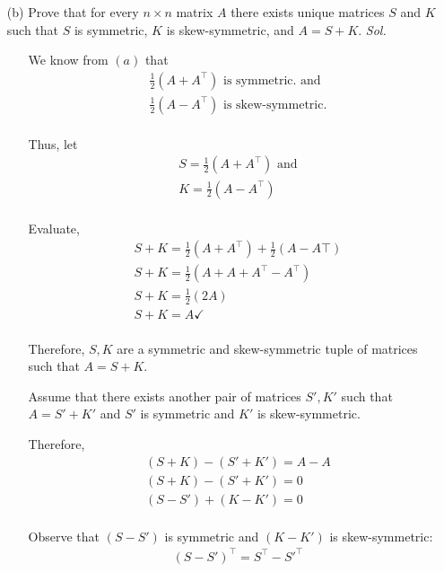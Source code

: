 \documentclass[11pt]{article}
\begin{document}
\begin{itemize}
  \item[(b)] Prove that for every $n \times n$ matrix $A$ there exists unique 
    matrices $S$ and $K$ such that $S$ is symmetric, $K$ is skew-symmetric, and
    $A = S + K$.
    \textit{ Sol. }
    \begin{itemize}
      \item[] We know from $(a)$ that \begin{align*}
          & \frac{1}{2}(A + A^\top) \text{ is symmetric. and}\\
          & \frac{1}{2}(A - A^\top) \text{ is skew-symmetric.}\\
        \end{align*}
      \item[] Thus, let \begin{align*}
          & S = \frac{1}{2}(A + A^\top) \text{ and}\\
          & K = \frac{1}{2}(A - A^\top)\\
        \end{align*}
      \item[] Evaluate, \begin{align*}
          & S + K = \frac{1}{2}(A + A^\top) + \frac{1}{2}(A - A\top) \\
          & S + K = \frac{1}{2}(A + A + A^\top - A^\top)\\
          & S + K = \frac{1}{2}(2A)\\
          & S + K = A \checkmark\\
        \end{align*}
      \item[]Therefore, $S, K$ are a symmetric and skew-symmetric tuple of 
        matrices such that $A = S + K$.
      \item[] Assume that there exists another pair of matrices $S', K'$ such that
        $A = S' + K'$ and $S'$ is symmetric and $K'$ is skew-symmetric.
      \item[] Therefore, 
        \begin{align*}
          & (S + K) - (S' + K') = A - A \\
          & (S + K) - (S' + K') = 0 \\
          & (S - S') + (K - K') = 0 \\
        \end{align*}
      \item[] Observe that $(S - S')$ is symmetric and $(K - K')$ is skew-symmetric: \begin{align*}
        & (S - S')^\top = S^\top - S'^\top \\

\end{align*}
\end{itemize}
\end{itemize}
\end{document}
